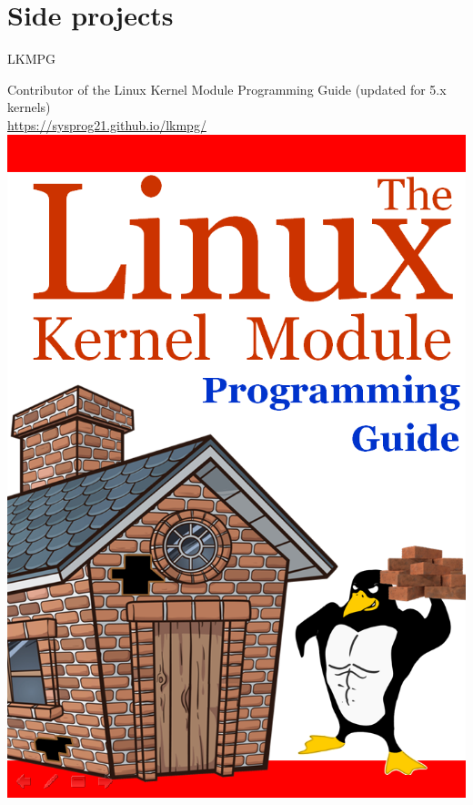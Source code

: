 \documentclass{beamer}
\begin{document}
\section{Side projects}
\begin{frame}{LKMPG}
    \begin{multicols*}{2}
        {Contributor of the Linux Kernel Module Programming Guide (updated for 5.x kernels)\\
            \url{https://sysprog21.github.io/lkmpg/}}
        \includegraphics[width=.52\textheight]{images/lkmpg.png}
    \end{multicols*}
\end{frame}
\end{document}
